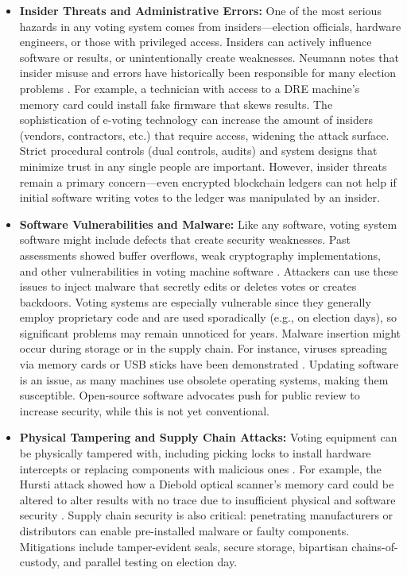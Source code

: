 \documentclass[a4paper,10pt]{report}
\begin{document}
\begin{itemize}
\item \textbf {Insider Threats and Administrative Errors:}  One of the most serious hazards in any voting system comes from insiders---election officials, hardware engineers, or those with privileged access.  Insiders can actively influence software or results, or unintentionally create weaknesses.  Neumann notes that insider misuse and errors have historically been responsible for many election problems \cite{neumann1996computer}.  For example, a technician with access to a DRE machine’s memory card could install fake firmware that skews results.  The sophistication of e-voting technology can increase the amount of insiders (vendors, contractors, etc.) that require access, widening the attack surface.  Strict procedural controls (dual controls, audits) and system designs that minimize trust in any single people are important.  However, insider threats remain a primary concern—even encrypted blockchain ledgers can not help if initial software writing votes to the ledger was manipulated by an insider.
    
     \item \textbf {Software Vulnerabilities and Malware:}  Like any software, voting system software might include defects that create security weaknesses.  Past assessments showed buffer overflows, weak cryptography implementations, and other vulnerabilities in voting machine software \cite{burr2011analysis}.  Attackers can use these issues to inject malware that secretly edits or deletes votes or creates backdoors.  Voting systems are especially vulnerable since they generally employ proprietary code and are used sporadically (e.g., on election days), so significant problems may remain unnoticed for years.  Malware insertion might occur during storage or in the supply chain.  For instance, viruses spreading via memory cards or USB sticks have been demonstrated \cite{uconn2012_combined}.  Updating software is an issue, as many machines use obsolete operating systems, making them susceptible.  Open-source software advocates push for public review to increase security, while this is not yet conventional.
    
     \item \textbf {Physical Tampering and Supply Chain Attacks:}  Voting equipment can be physically tampered with, including picking locks to install hardware intercepts or replacing components with malicious ones \cite{uconn2012_combined}.  For example, the Hursti attack showed how a Diebold optical scanner’s memory card could be altered to alter results with no trace due to insufficient physical and software security \cite{uconn2012_combined}.  Supply chain security is also critical: penetrating manufacturers or distributors can enable pre-installed malware or faulty components.  Mitigations include tamper-evident seals, secure storage, bipartisan chains-of-custody, and parallel testing on election day.
    

\end{itemize}
\end{document}
